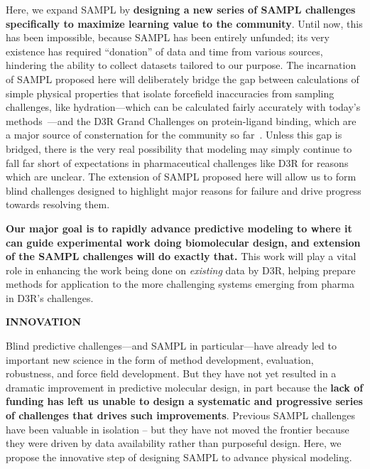 \documentclass[11pt]{article}
\begin{document}
Here, we expand SAMPL by \textbf{designing a new series of SAMPL challenges specifically to maximize learning value to the community}.
Until now, this has been impossible, because SAMPL has been entirely unfunded; its very existence has required ``donation'' of data and time from various sources, hindering the ability to collect datasets tailored to our purpose. 
The incarnation of SAMPL proposed here will deliberately bridge the gap between calculations of simple physical properties that isolate forcefield inaccuracies from sampling challenges, like hydration---which can be calculated fairly accurately with today's methods~\cite{mobley_blind_2014-1}---and the D3R Grand Challenges on protein-ligand binding, which are a major source of consternation for the community so far~\cite{ignjatovic_binding-affinity_2016, deng_large_2016, sunseri_d3r_2016, gathiaka_d3r_2016}.
Unless this gap is bridged, there is the very real possibility that modeling may simply continue to fall far short of expectations in pharmaceutical challenges like D3R for reasons which are unclear.
The extension of SAMPL proposed here will allow us to form blind challenges designed to highlight major reasons for failure and drive progress towards resolving them.


\textbf{Our major goal is to rapidly advance predictive modeling to where it can guide experimental work doing biomolecular design, and extension of the SAMPL challenges will do exactly that.} This work will play a vital role in enhancing the work being done on \emph{existing} data by D3R, helping prepare methods for application to the more challenging systems emerging from pharma in D3R's challenges. 

{\large \bf INNOVATION}

Blind predictive challenges---and SAMPL in particular---have already led to important new science in the form of method development, evaluation, robustness, and force field development. 
But they have not yet resulted in a dramatic improvement in predictive molecular design, in part because the \textbf{lack of funding has left us unable to design a systematic and progressive series of challenges that drives such improvements}. 
Previous SAMPL challenges have been valuable in isolation -- but they have not moved the frontier because they were driven by data availability rather than purposeful design.
Here, we propose the innovative step of designing SAMPL to advance physical modeling.
\end{document}
